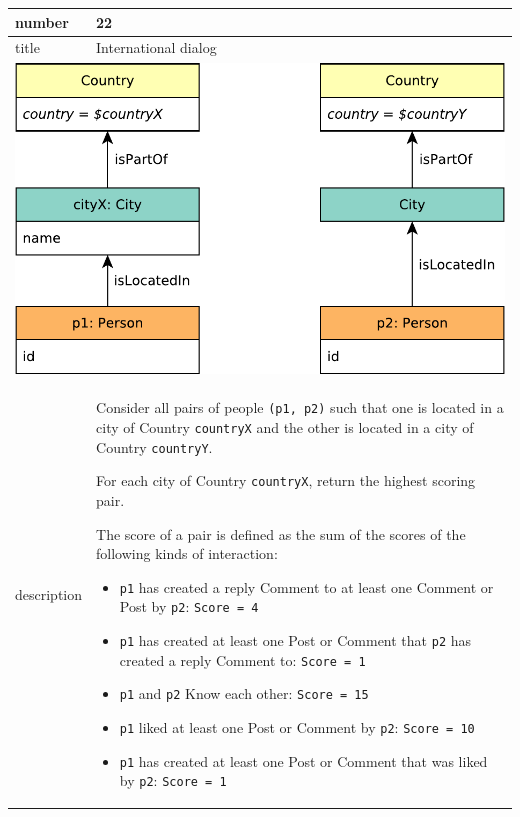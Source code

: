 \renewcommand*{\arraystretch}{1.5}
\noindent\begin{tabularx}{17cm}{|p{1.95cm}|X|}
	\hline
	number      & 22                                                          \\ \hline
	title       & International dialog                                                           \\ \hline
	\multicolumn{2}{|c|}{ \includegraphics[scale=\patternscale,margin=0cm .2cm]{patterns/q22}} \\ \hline
	description & Consider all pairs of people \texttt{(p1,\ p2)} such that one is located
in a city of Country \texttt{countryX} and the other is located in a
city of Country \texttt{countryY}.

For each city of Country \texttt{countryX}, return the highest scoring
pair.

The score of a pair is defined as the sum of the scores of the following
kinds of interaction:

\begin{itemize}
\tightlist
\item
  \texttt{p1} has created a reply Comment to at least one Comment or
  Post by \texttt{p2}: \texttt{Score\ =\ 4}
\item
  \texttt{p1} has created at least one Post or Comment that \texttt{p2}
  has created a reply Comment to: \texttt{Score\ =\ 1}
\item
  \texttt{p1} and \texttt{p2} Know each other: \texttt{Score\ =\ 15}
\item
  \texttt{p1} liked at least one Post or Comment by \texttt{p2}:
  \texttt{Score\ =\ 10}
\item
  \texttt{p1} has created at least one Post or Comment that was liked by
  \texttt{p2}: \texttt{Score\ =\ 1}
\end{itemize}


\end{tabularx}
